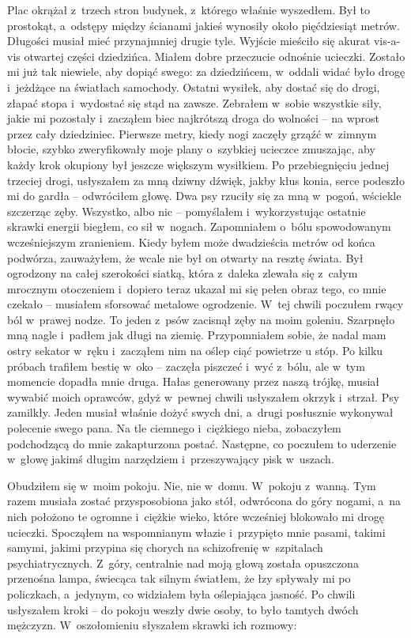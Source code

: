 Plac okrążał z~trzech stron budynek, z~którego właśnie wyszedłem. Był to prostokąt, a~odstępy między ścianami jakieś wynosiły około pięćdziesiąt metrów.  Długości musiał mieć przynajmniej drugie tyle. Wyjście mieściło się akurat vis-a-vis otwartej części dziedzińca. Miałem dobre przeczucie odnośnie ucieczki. Zostało mi już tak niewiele, aby dopiąć swego: za dziedzińcem, w~oddali widać było drogę i~jeżdżące na światłach samochody. Ostatni wysiłek, aby dostać się do drogi, złapać stopa i~wydostać się stąd na zawsze. Zebrałem w~sobie wszystkie siły, jakie mi pozostały i~zacząłem biec najkrótszą droga do wolności -- na wprost przez cały dziedziniec. Pierwsze metry, kiedy nogi zaczęły grząźć w~zimnym błocie, szybko zweryfikowały moje plany o~szybkiej ucieczce zmuszając, aby każdy krok okupiony był jeszcze większym wysiłkiem. Po przebiegnięciu jednej trzeciej drogi, usłyszałem za mną dziwny dźwięk, jakby kłus konia, serce podeszło mi do gardła -- odwróciłem głowę. Dwa psy rzuciły się za mną w~pogoń, wściekle szczerząc zęby. Wszystko, albo nic -- pomyślałem i~wykorzystując ostatnie skrawki energii biegłem, co sił w~nogach. Zapomniałem o~bólu spowodowanym wcześniejszym zranieniem. Kiedy byłem może dwadzieścia metrów od końca podwórza, zauważyłem, że wcale nie był on otwarty na resztę świata. Był ogrodzony na całej szerokości siatką, która z~daleka zlewała się z~całym mrocznym otoczeniem i~dopiero teraz ukazał mi się pełen obraz tego, co mnie czekało -- musiałem sforsować metalowe ogrodzenie. W~tej chwili poczułem rwący ból w~prawej nodze. To jeden z~psów zacisnął zęby na moim goleniu. Szarpnęło mną nagle i~padłem jak długi na ziemię. Przypomniałem sobie, że nadal mam ostry sekator w~ręku i~zacząłem nim na oślep ciąć powietrze u stóp. Po kilku próbach trafiłem bestię w~oko -- zaczęła piszczeć i~wyć z~bólu, ale w~tym momencie dopadła mnie druga. Hałas generowany przez naszą trójkę, musiał wywabić moich oprawców, gdyż w~pewnej chwili usłyszałem okrzyk i~strzał. Psy zamilkły. Jeden musiał właśnie dożyć swych dni, a~drugi posłusznie wykonywał polecenie swego pana. Na tle ciemnego i~ciężkiego nieba, zobaczyłem podchodzącą do mnie zakapturzona postać. Następne, co poczułem to uderzenie w~głowę jakimś długim narzędziem i~przeszywający pisk w~uszach.

Obudziłem się w~moim pokoju. Nie, nie w~domu. W~pokoju z~wanną. Tym razem musiała zostać przysposobiona jako stół, odwrócona do góry nogami, a~na nich położono te ogromne i~ciężkie wieko, które wcześniej blokowało mi drogę ucieczki. Spocząłem na wspomnianym włazie i~przypięto mnie pasami, takimi samymi, jakimi przypina się chorych na schizofrenię w~szpitalach psychiatrycznych. Z~góry, centralnie nad moją głową została opuszczona przenośna lampa, świecąca tak silnym światłem, że łzy spływały mi po policzkach, a~jedynym, co widziałem była oślepiająca jasność. Po chwili usłyszałem kroki -- do pokoju weszły dwie osoby, to było tamtych dwóch mężczyzn. W~oszołomieniu słyszałem skrawki ich rozmowy: 

